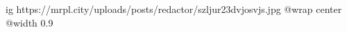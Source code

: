 
 
 
 
 

\ifcmt
  ig https://mrpl.city/uploads/posts/redactor/szljur23dvjosvjs.jpg
  @wrap center
  @width 0.9
\fi
